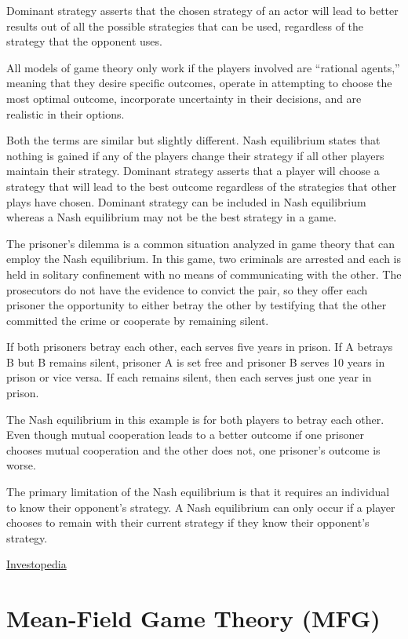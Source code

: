 \documentclass[
]{book}
\begin{document}
Dominant strategy asserts that the chosen strategy of an actor will lead to better results out of all the possible strategies that can be used, regardless of the strategy that the opponent uses.

All models of game theory only work if the players involved are ``rational agents,'' meaning that they desire specific outcomes, operate in attempting to choose the most optimal outcome, incorporate uncertainty in their decisions, and are realistic in their options.

Both the terms are similar but slightly different. Nash equilibrium states that nothing is gained if any of the players change their strategy if all other players maintain their strategy. Dominant strategy asserts that a player will choose a strategy that will lead to the best outcome regardless of the strategies that other plays have chosen. Dominant strategy can be included in Nash equilibrium whereas a Nash equilibrium may not be the best strategy in a game.

The prisoner's dilemma is a common situation analyzed in game theory that can employ the Nash equilibrium. In this game, two criminals are arrested and each is held in solitary confinement with no means of communicating with the other. The prosecutors do not have the evidence to convict the pair, so they offer each prisoner the opportunity to either betray the other by testifying that the other committed the crime or cooperate by remaining silent.

If both prisoners betray each other, each serves five years in prison. If A betrays B but B remains silent, prisoner A is set free and prisoner B serves 10 years in prison or vice versa. If each remains silent, then each serves just one year in prison.

The Nash equilibrium in this example is for both players to betray each other. Even though mutual cooperation leads to a better outcome if one prisoner chooses mutual cooperation and the other does not, one prisoner's outcome is worse.

The primary limitation of the Nash equilibrium is that it requires an individual to know their opponent's strategy. A Nash equilibrium can only occur if a player chooses to remain with their current strategy if they know their opponent's strategy.

\href{https://www.investopedia.com/terms/n/nash-equilibrium.asp}{Investopedia}

\hypertarget{mean-field-game-theory-mfg}{%
\section{Mean-Field Game Theory (MFG)}\label{mean-field-game-theory-mfg}}
\end{document}
